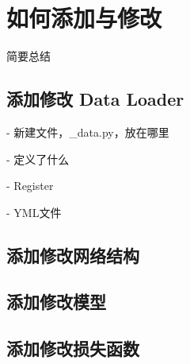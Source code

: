 \documentclass[../main.tex]{subfiles}
\begin{document}
\chapter{如何添加与修改}
\vspace{-2cm}

简要总结

\section{添加修改 Data Loader}

- 新建文件，\_data.py，放在哪里

- 定义了什么

- Register

- YML文件

\section{添加修改网络结构}

\section{添加修改模型}

\section{添加修改损失函数}
\end{document}

